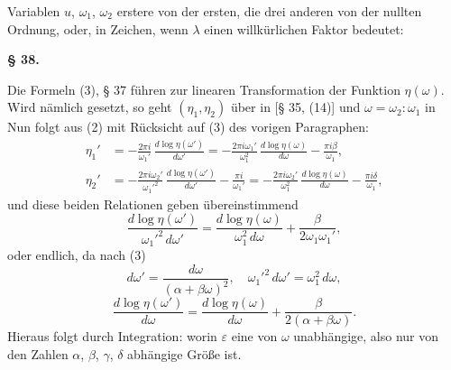 
Variablen $u$, $\omega_1$, $\omega_2$ erstere von der ersten, die drei anderen von der nullten Ordnung, oder, in Zeichen, wenn $\lambda$ einen willkürlichen Faktor bedeutet:

\begin{center}
\textbf{§ 38. }
\end{center}

Die Formeln (3), § 37 führen zur linearen Transformation der Funktion $\eta(\omega)$. Wird nämlich
gesetzt, so geht $(\eta_1, \eta_2)$ über in
[§ 35, (14)] und $\omega = \omega_2 : \omega_1$ in
Nun folgt aus (2) mit Rücksicht auf (3) des vorigen Paragraphen:
\[
\begin{aligned}
\eta_1' &= -\frac{2\pi i}{\omega_1'}\,\frac{d\log\eta(\omega')}{d\omega'} = -\frac{2\pi i \omega_1'}{\omega_1^2}\,\frac{d\log\eta(\omega)}{d\omega} - \frac{\pi i \beta}{\omega_1}, \\
\eta_2' &= -\frac{2\pi i \omega_2'}{{\omega_1'}^2}\,\frac{d\log\eta(\omega')}{d\omega'} - \frac{\pi i}{\omega_1'} = -\frac{2\pi i \omega_2'}{\omega_1^2}\,\frac{d\log\eta(\omega)}{d\omega} - \frac{\pi i \delta}{\omega_1},
\end{aligned}
\]
und diese beiden Relationen geben übereinstimmend
\[
\frac{d\log\eta(\omega')}{{\omega_1'}^2\,d\omega'} = \frac{d\log\eta(\omega)}{\omega_1^2\,d\omega} + \frac{\beta}{2\omega_1\omega_1'},
\]
oder endlich, da nach (3)
\[
d\omega' = \frac{d\omega}{(\alpha+\beta\omega)^2}, \quad {\omega_1'}^2\,d\omega' = \omega_1^2\,d\omega,
\]
\[
\frac{d\log\eta(\omega')}{d\omega} = \frac{d\log\eta(\omega)}{d\omega} + \frac{\beta}{2(\alpha+\beta\omega)}.
\]
Hieraus folgt durch Integration:
worin $\varepsilon$ eine von $\omega$ unabhängige, also nur von den Zahlen $\alpha$, $\beta$, $\gamma$, $\delta$ abhängige Größe ist.
